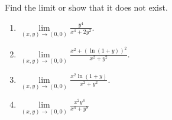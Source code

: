 Find the limit or show that it does not exist.

\begin{enumerate}
\item $\displaystyle \lim\limits_{(x,y)\to (0,0)}\frac{ y^4}{x^4+2y^2}$.


\item $\displaystyle \lim\limits_{(x,y)\to (0,0)} \frac{x^2+\left(\ln (1+y)\right)^2}{x^2+y^2}$.


\item $\displaystyle \lim\limits_{(x,y)\to (0,0)} \frac{x^2\ln (1+y)}{x^2+y^2}$.


\item $\displaystyle \lim\limits_{(x,y)\to (0,0)} \frac{x^2y^4}{x^4+y^8}$


\end{enumerate}